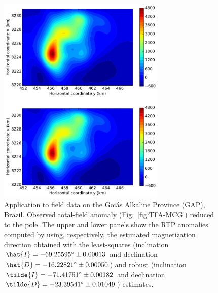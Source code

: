\documentclass[journal abbreviation, npg]{copernicus}
\providecommand{\DIFaddend}{} %
\providecommand{\DIFaddbeginFL}{} %
\providecommand{\DIFaddendFL}{} %
\providecommand{\DIFdelbeginFL}{} %
\providecommand{\DIFdelendFL}{} %
\begin{document}
\DIFaddend \begin{figure}[t]
\DIFdelbeginFL %
\DIFdelendFL \DIFaddbeginFL \includegraphics[width=80mm]{Figures/npgd-2014-0069-f18}
\DIFaddendFL \caption{Application to field data on the Goi\'{a}s Alkaline Province
  (GAP), Brazil. Observed total-field anomaly (Fig.~\ref{fig:TFA-MCG})
  reduced to the pole. The upper and lower panels show the RTP
  anomalies computed by using, respectively, the estimated
  magnetization direction obtained with the least-squares (inclination
  $\hat{I} = -69.25595{\degree} \pm 0.00013${\degree} and declination
  $\hat{D} = -16.22821{\degree} \pm 0.00050${\degree}) and robust
  (inclination $\tilde{I} = -71.41751{\degree} \pm 0.00182${\degree}
  and declination $\tilde{D} = -23.39541{\degree} \pm
  0.01049${\degree}) estimates. }
\label{fig:TFA-MCG-RTP}
\end{figure}
\end{document}
